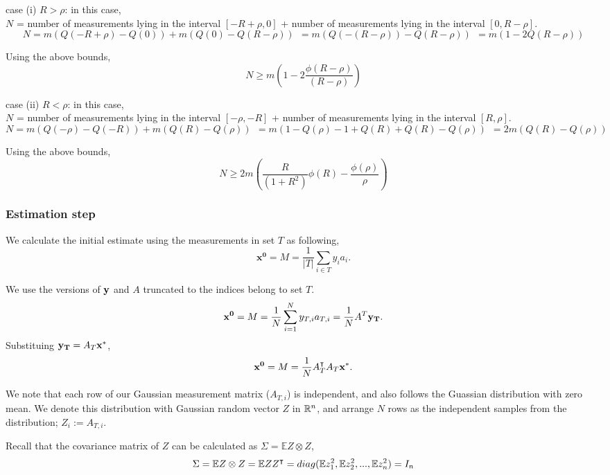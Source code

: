 case (i) $R > \rho$: in this case, \\
$N$ = number of measurements lying in the interval $[-R + \rho,0]$ + number of measurements lying in the interval $[0, R-\rho]$.
\begin{equation}
N = m\left(Q(-R+\rho)- Q(0)\right) + m\left(Q(0)- Q(R-\rho)\right)
~~ = m\left(Q(-(R-\rho))- Q(R-\rho)\right) 
~~ = m\left(1-2Q(R-\rho)\right)
\end{equation}

Using the above bounds,
$$
N \geq m \left(1-2\frac{\phi(R-\rho)}{(R-\rho)} \right)
$$

case (ii) $R < \rho$: in this case, \\
$N$ = number of measurements lying in the interval $[-\rho,-R]$ + number of measurements lying in the interval $[R,\rho]$.
\begin{equation}
N = m\left(Q(-\rho)- Q(-R)\right) + m\left(Q(R)- Q(\rho)\right)
~~ = m\left(1 - Q(\rho)-1 +Q(R) +Q(R) -Q(\rho)\right) 
~~ = 2m\left(Q(R)-Q(\rho)\right)
\end{equation}

Using the above bounds,
$$
N \geq 2m \left(\frac{R}{(1+R^2)} \phi(R) - \frac{\phi(\rho)}{\rho}\right)
$$


\subsubsection{Estimation step}

We calculate the initial estimate using the measurements in set $T$ as following,
$$
\mathbf{{x}^0} = M = \frac{1}{|T|}\sum_{i\in T}y_{i}a_{i}.
$$

We use the versions of $\mathbf{y}$ and $A$ truncated to the indices belong to set $T$.
$$
\mathbf{{x}^0} = M = \frac{1}{N}\sum_{i=1}^{N}y_{T,i}a_{T,i} =  \frac{1}{N}A^T\mathbf{y_T}.
$$
Substituing $\mathbf{y_T}=A_T\mathbf{x^*}$,
$$
\mathbf{{x}^0} = M = \frac{1}{N}A_T^\intercal A_T\mathbf{x^*}.
$$

We note that each row of our Gaussian measurement matrix ($A_{T,i}$) is independent, and also follows the Guassian distribution with zero mean.  
We denote this distribution with Gaussian random vector $Z$ in ${\mathbb{R}}^n$, and arrange $N$ rows as the independent samples from the distribution; $Z_i := A_{T,i}$. 

Recall that the covariance matrix of $Z$ can be calculated as $\Sigma = \mathbb{E}Z\otimes Z$,
$$
\Sigma= \mathbb{E}Z\otimes Z = \mathbb{E} ZZ^\intercal = diag(\mathbb{E}z_1^2,\mathbb{E}z_2^2,...,\mathbb{E}z_n^2) = I_n
$$

